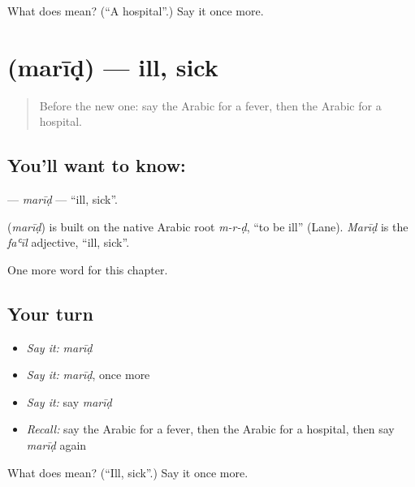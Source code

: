 \begin{tcolorbox}[breakable,colback=teal!4,colframe=teal!35!black,title={Before you move on}]
What does  mean? (\textquotedblleft{}A hospital\textquotedblright{}.) Say it once more.
\end{tcolorbox}
\section[\texorpdfstring{\ar{مريض} (marīḍ)}{مريض (marīḍ)}]{ (marīḍ) — ill, sick}

\label{lesson:AR-C53-marid}



\begin{quote}
Before the new one: say the Arabic for a fever, then the Arabic for a hospital.
\end{quote}

\subsection*{You'll want to know: }
\textbf{} — \emph{marīḍ} — \textquotedblleft{}ill, sick\textquotedblright{}.

\begin{cousinweb}
\textbf{} (\emph{marīḍ}) is built on the native Arabic root \emph{m-r-ḍ}, \textquotedblleft{}to be ill\textquotedblright{} (Lane). \emph{Marīḍ} is the \emph{faʿīl} adjective, \textquotedblleft{}ill, sick\textquotedblright{}.
\end{cousinweb}

\begin{grammarlens}[title={What you've built}]
One more word for this chapter.
\end{grammarlens}

\subsection*{Your turn}
\begin{itemize}
\raggedright
  \item \emph{Say it:} \emph{marīḍ}
  \item \emph{Say it:} \emph{marīḍ}, once more
  \item \emph{Say it:} say \emph{marīḍ}
  \item \emph{Recall:} say the Arabic for a fever, then the Arabic for a hospital, then say \emph{marīḍ} again
\end{itemize}

\begin{tcolorbox}[breakable,colback=teal!4,colframe=teal!35!black,title={Before you move on}]
What does  mean? (\textquotedblleft{}Ill, sick\textquotedblright{}.) Say it once more.
\end{tcolorbox}
